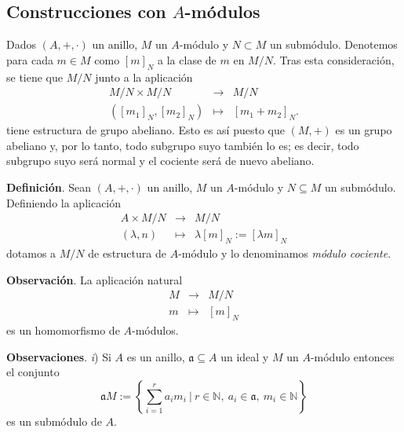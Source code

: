 \documentclass[a4paper,12pt]{article}
\newcommand{\N}{\mathbb{N}}
\newcommand{\af}{\mathfrak{a}}
\begin{document}
\subsection{Construcciones con $A$-módulos}
Dados $(A,+,\cdot)$ un anillo, $M$ un $A$-módulo y $N\subset M$ un submódulo. Denotemos para cada $m\in M$ como $[m]_N$ a la clase de $m$ en $M/N$. Tras esta consideración, se tiene que $M/N$ junto a la aplicación
$$\begin{array}{rcl}
    M/N\times M/N&\longrightarrow&M/N\\
    ([m_1]_N,[m_2]_N)&\longmapsto&[m_1+m_2]_N.
\end{array}$$
tiene estructura de grupo abeliano. Esto es así puesto que $(M,+)$ es un grupo abeliano y, por lo tanto, todo subgrupo suyo también lo es; es decir, todo subgrupo suyo será normal y el cociente será de nuevo abeliano.

\textbf{Definición}. Sean $(A,+,\cdot)$ un anillo, $M$ un $A$-módulo y $N\subseteq M$ un submódulo. Definiendo la aplicación
$$\begin{array}{rcl}
    A\times M/N&\longrightarrow&M/N\\
    (\lambda,n)&\longmapsto&\lambda[m]_N:=[\lambda m]_N
\end{array}$$
dotamos a $M/N$ de estructura de $A$-módulo y lo denominamos \textit{módulo cociente}.

\textbf{Observación}. La aplicación natural
$$\begin{array}{rcl}
    M&\longrightarrow&M/N\\
    m&\longmapsto&[m]_N
\end{array}$$
es un homomorfismo de $A$-módulos.

\textbf{Observaciones}. \textit{i}) Si $A$ es un anillo, $\af\subseteq A$ un ideal y $M$ un $A$-módulo entonces el conjunto$$\af M:=\left\{\sum_{i=1}^ra_im_i\ |\ r\in\N,\ a_i\in\af,\ m_i\in\N\right\}$$ es un submódulo de $A$.
\end{document}
